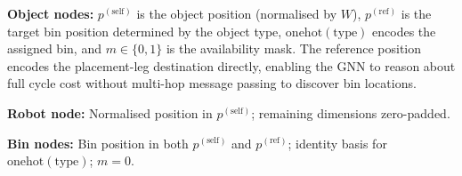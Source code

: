 \documentclass[conference]{IEEEtran}
\begin{document}
\textbf{Object nodes:} $p^{(\text{self})}$ is the object position (normalised by $W$), $p^{(\text{ref})}$ is the target bin position determined by the object type, $\text{onehot}(\text{type})$ encodes the assigned bin, and $m \in \{0,1\}$ is the availability mask. The reference position encodes the placement-leg destination directly, enabling the GNN to reason about full cycle cost without multi-hop message passing to discover bin locations.

\textbf{Robot node:} Normalised position in $p^{(\text{self})}$; remaining dimensions zero-padded.

\textbf{Bin nodes:} Bin position in both $p^{(\text{self})}$ and $p^{(\text{ref})}$; identity basis for $\text{onehot}(\text{type})$; $m{=}0$.

\end{document}
